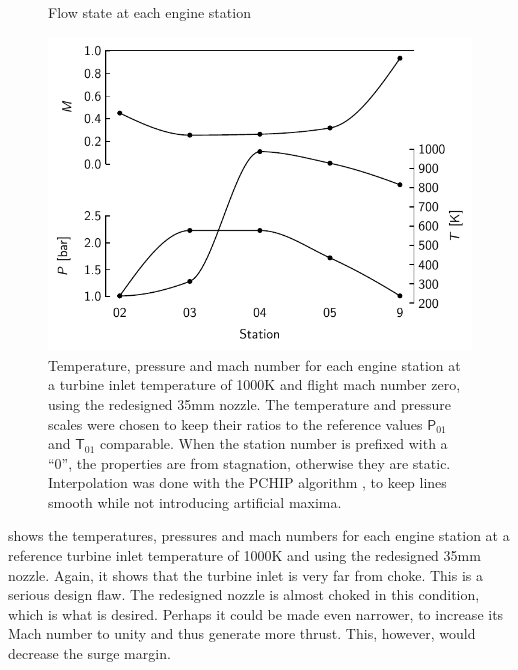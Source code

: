 \begin{figure}
    \caption{Flow state at each engine station}
    \label{fig:stations}
    \includegraphics{fig/stations1000K}
    \caption*{Temperature, pressure and mach number for each engine station at a turbine inlet temperature of 1000K and flight mach number zero, using the redesigned 35mm nozzle. The temperature and pressure scales were chosen to keep their ratios to the reference values $\mathsf P_{01}$ and $\mathsf T_{01}$ comparable. When the station number is prefixed with a ``0'', the properties are from stagnation, otherwise they are static. Interpolation was done with the PCHIP algorithm \cite{Fritsch1980}, to keep lines smooth while not introducing artificial maxima.}
\end{figure}

 shows the temperatures, pressures and mach numbers for each engine station at a reference turbine inlet temperature of 1000K and using the redesigned 35mm nozzle.
Again, it shows that the turbine inlet is very far from choke. This is a serious design flaw. The redesigned nozzle is almost choked in this condition, which is what is desired. Perhaps it could be made even narrower, to increase its Mach number to unity and thus generate more thrust. This, however, would decrease the surge margin.


